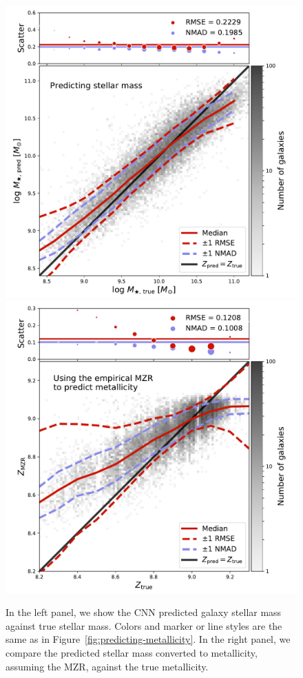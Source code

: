\documentclass[fleqn,usenatbib]{mnras}
\begin{document}
\begin{figure}
	\includegraphics[width=\columnwidth]{05-a-prediction_mass.pdf}
	\includegraphics[width=\columnwidth]{05-b-prediction_mzr.pdf}
	\caption{\label{fig:mass-metallicity}
		In the left panel, we show the CNN predicted galaxy stellar mass against true stellar mass. Colors and marker or line styles are the same as in Figure~\ref{fig:predicting-metallicity}. In the right panel, we compare the predicted stellar mass converted to metallicity, assuming the \citet{Tremonti2004} MZR, against the true metallicity.
		}
\end{figure}
\end{document}
